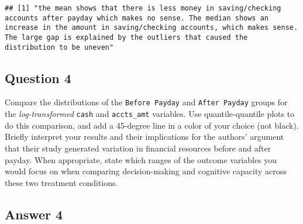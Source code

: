\documentclass[
]{article}
\newenvironment{Shaded}{\begin{snugshade}}{\end{snugshade}}
\newcommand{\DataTypeTok}[1]{\textcolor[rgb]{0.13,0.29,0.53}{#1}}
\newcommand{\DecValTok}[1]{\textcolor[rgb]{0.00,0.00,0.81}{#1}}
\newcommand{\FloatTok}[1]{\textcolor[rgb]{0.00,0.00,0.81}{#1}}
\newcommand{\KeywordTok}[1]{\textcolor[rgb]{0.13,0.29,0.53}{\textbf{#1}}}
\newcommand{\NormalTok}[1]{#1}
\newcommand{\OperatorTok}[1]{\textcolor[rgb]{0.81,0.36,0.00}{\textbf{#1}}}
\newcommand{\StringTok}[1]{\textcolor[rgb]{0.31,0.60,0.02}{#1}}
\begin{document}
\begin{verbatim}
## [1] "the mean shows that there is less money in saving/checking accounts after payday which makes no sense. The median shows an increase in the amount in saving/checking accounts, which makes sense. The large gap is explained by the outliers that caused the distribution to be uneven"
\end{verbatim}

\hypertarget{question-4}{%
\subsection{Question 4}\label{question-4}}

Compare the distributions of the \texttt{Before\ Payday} and
\texttt{After\ Payday} groups for the \emph{log-transformed}
\texttt{cash} and \texttt{accts\_amt} variables. Use quantile-quantile
plots to do this comparison, and add a 45-degree line in a color of your
choice (not black). Briefly interpret your results and their
implications for the authors' argument that their study generated
variation in financial resources before and after payday. When
appropriate, state which ranges of the outcome variables you would focus
on when comparing decision-making and cognitive capacity across these
two treatment conditions.

\hypertarget{answer-4}{%
\subsection{Answer 4}\label{answer-4}}

\begin{Shaded}
\end{Shaded}
\end{document}
